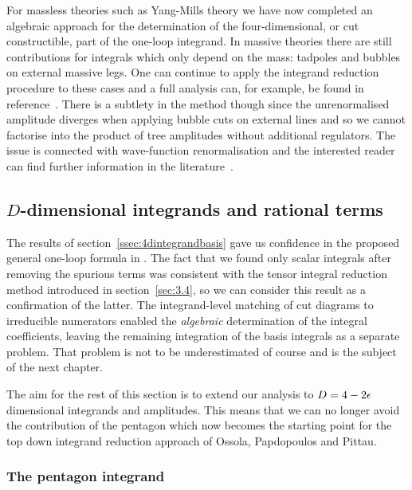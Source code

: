 For massless theories such as Yang-Mills theory we have now completed an
algebraic approach for the determination of the four-dimensional, or cut
constructible, part of the one-loop integrand. In massive theories there are
still contributions for integrals which only depend on the mass: tadpoles and
bubbles on external massive legs. One can continue to apply the integrand
reduction procedure to these cases and a full analysis can, for example, be
found in reference~\cite{ch3_Ellis:2011cr}. There is a subtlety in the method
though since the unrenormalised amplitude diverges when applying bubble cuts on
external lines and so we cannot factorise into the product of tree amplitudes
without additional regulators. The issue is connected with wave-function
renormalisation and the interested reader can find further information in the
literature~\cite{ch3_Ellis:2008ir,ch3_Britto:2011cr,ch3_Badger:2017gta}.

\subsection{$D$-dimensional integrands and rational terms}

The results of section~\ref{ssec:4dintegrandbasis} gave us confidence in the
proposed general one-loop formula in . The fact
that we found only scalar integrals after removing the spurious terms was
consistent with the tensor integral reduction method introduced in section~\ref{sec:3.4}, so we can consider this result as a confirmation of the latter. The
integrand-level matching of cut diagrams to irreducible numerators enabled the
\textit{algebraic} determination of the integral coefficients, leaving the
remaining integration of the basis integrals as a separate problem. That
problem is not to be underestimated of course and is the subject of the next
chapter.

The aim for the rest of this section is to extend our analysis to $D=4-2\epsilon$
dimensional integrands and amplitudes. This means that we can no longer avoid
the contribution of the pentagon which now becomes the starting point for the
top down integrand reduction approach of Ossola, Papdopoulos and Pittau. 

\subsubsection{The pentagon integrand}

